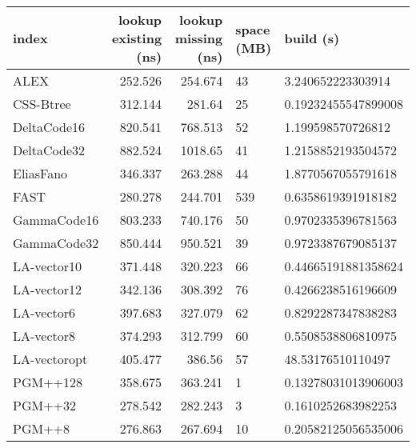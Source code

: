 \begin{tabular}{lrrll}
\hline
 index             &   lookup existing (ns) &   lookup missing (ns) & space (MB)   & build (s)             \\
\hline
 ALEX              &               252.526  &              254.674  & 43           & 3.240652223303914     \\
 CSS-Btree         &               312.144  &              281.64   & 25           & 0.19232455547899008   \\
 DeltaCode16       &               820.541  &              768.513  & 52           & 1.199598570726812     \\
 DeltaCode32       &               882.524  &             1018.65   & 41           & 1.2158852193504572    \\
 EliasFano         &               346.337  &              263.288  & 44           & 1.8770567055791618    \\
 FAST              &               280.278  &              244.701  & 539          & 0.6358619391918182    \\
 GammaCode16       &               803.233  &              740.176  & 50           & 0.9702335396781563    \\
 GammaCode32       &               850.444  &              950.521  & 39           & 0.9723387679085137    \\
 LA-vector10       &               371.448  &              320.223  & 66           & 0.44665191881358624   \\
 LA-vector12       &               342.136  &              308.392  & 76           & 0.4266238516196609    \\
 LA-vector6        &               397.683  &              327.079  & 62           & 0.8292287347838283    \\
 LA-vector8        &               374.293  &              312.799  & 60           & 0.5508538806810975    \\
 LA-vectoropt      &               405.477  &              386.56   & 57           & 48.53176510110497     \\
 PGM++128          &               358.675  &              363.241  & 1            & 0.13278031013906003   \\
 PGM++32           &               278.542  &              282.243  & 3            & 0.1610252683982253    \\
 PGM++8            &               276.863  &              267.694  & 10           & 0.20582125056535006   \\

\end{tabular}
